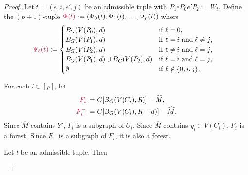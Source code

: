 \documentclass{patmorin}
\newcommand{\pat}[1]{\textcolor{Blue}{[Pat: #1]}}
\newcommand{\piotr}[1]{\textcolor{red}{Piotr: #1}}
\DeclareMathOperator{\dist}{dist}
\DeclarePairedDelimiter\set{\{}{\}}
\begin{document}
\begin{proof}

Let $t=(e,i,e',j)$ be an admissible tuple with $P_1eP_0e'P_2:=W_t$. Define the $(p+1)$-tuple $\mathdefin{\Psi(t)}:=(\Psi_0(t),\Psi_1(t),\ldots,\Psi_p(t))$ where
\begin{align*}
    \mathdefin{\Psi_\ell(t)} &:=
    \begin{cases}
        B_{G}(V(P_0),d)&\textrm{if $\ell=0$,}\\
        B_{G}(V(P_1),d)&\textrm{if $\ell=i$ and $\ell\neq j$,}\\
        B_{G}(V(P_2),d)&\textrm{if $\ell\neq i$ and $\ell= j$,}\\
        B_{G}(V(P_1),d)\cup B_{G}(V(P_2),d)&\textrm{if $\ell= i$ and $\ell= j$,}\\
        \emptyset&\textrm{if $\ell\notin\{0,i,j\}$.}
    \end{cases}
\end{align*}

For each $i\in[p]$, let 
\begin{align*}
\mathdefin{F_i}&:=G[B_G(V(C_i),R)]-\widehat{M},\\
\mathdefin{F_i^-}&:=G[B_G(V(C_i),R-d)]-\widehat{M}. 
\end{align*}
Since $\widehat{M}$ contains $Y'$, 
$F_i$ is a subgraph of $U_i$.  Since $\widehat{M}$ contains $y_i\in V(C_i)$, $F_i$ is a forest.  Since $F^-_i$ is a subgraph of $F_i$, it is also a forest.

\begin{clm}\label{clm:three-components}
Let $t$ be an admissible tuple. Then
\end{clm}


\end{proof}
\end{document}
